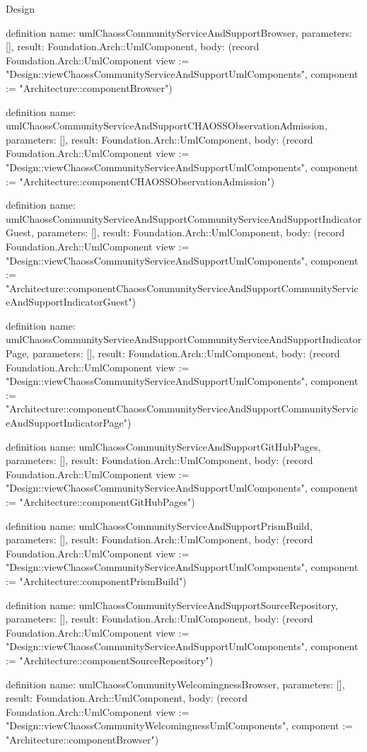 \begin{lexlean}{Design}
\begin{semanticmodule}
definition{
  name: umlChaossCommunityServiceAndSupportBrowser,
  parameters: [],
  result: Foundation.Arch::UmlComponent,
  body: (record Foundation.Arch::UmlComponent {view := "Design::viewChaossCommunityServiceAndSupportUmlComponents", component := "Architecture::componentBrowser"})
}

definition{
  name: umlChaossCommunityServiceAndSupportCHAOSSObservationAdmission,
  parameters: [],
  result: Foundation.Arch::UmlComponent,
  body: (record Foundation.Arch::UmlComponent {view := "Design::viewChaossCommunityServiceAndSupportUmlComponents", component := "Architecture::componentCHAOSSObservationAdmission"})
}

definition{
  name: umlChaossCommunityServiceAndSupportCommunityServiceAndSupportIndicatorGuest,
  parameters: [],
  result: Foundation.Arch::UmlComponent,
  body: (record Foundation.Arch::UmlComponent {view := "Design::viewChaossCommunityServiceAndSupportUmlComponents", component := "Architecture::componentChaossCommunityServiceAndSupportCommunityServiceAndSupportIndicatorGuest"})
}

definition{
  name: umlChaossCommunityServiceAndSupportCommunityServiceAndSupportIndicatorPage,
  parameters: [],
  result: Foundation.Arch::UmlComponent,
  body: (record Foundation.Arch::UmlComponent {view := "Design::viewChaossCommunityServiceAndSupportUmlComponents", component := "Architecture::componentChaossCommunityServiceAndSupportCommunityServiceAndSupportIndicatorPage"})
}

definition{
  name: umlChaossCommunityServiceAndSupportGitHubPages,
  parameters: [],
  result: Foundation.Arch::UmlComponent,
  body: (record Foundation.Arch::UmlComponent {view := "Design::viewChaossCommunityServiceAndSupportUmlComponents", component := "Architecture::componentGitHubPages"})
}

definition{
  name: umlChaossCommunityServiceAndSupportPrismBuild,
  parameters: [],
  result: Foundation.Arch::UmlComponent,
  body: (record Foundation.Arch::UmlComponent {view := "Design::viewChaossCommunityServiceAndSupportUmlComponents", component := "Architecture::componentPrismBuild"})
}

definition{
  name: umlChaossCommunityServiceAndSupportSourceRepository,
  parameters: [],
  result: Foundation.Arch::UmlComponent,
  body: (record Foundation.Arch::UmlComponent {view := "Design::viewChaossCommunityServiceAndSupportUmlComponents", component := "Architecture::componentSourceRepository"})
}

definition{
  name: umlChaossCommunityWelcomingnessBrowser,
  parameters: [],
  result: Foundation.Arch::UmlComponent,
  body: (record Foundation.Arch::UmlComponent {view := "Design::viewChaossCommunityWelcomingnessUmlComponents", component := "Architecture::componentBrowser"})
}


\end{semanticmodule}
\end{lexlean}
